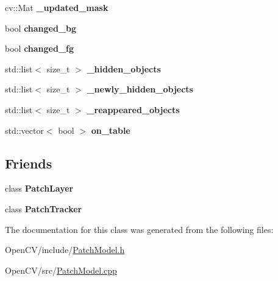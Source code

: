 \begin{DoxyCompactItemize}
cv\+::\+Mat {\bfseries \+\_\+updated\+\_\+mask}
\item 
\hypertarget{classskl_1_1_patch_model_a04e87619d969bf0feb95d6cef58aee38}{}\label{classskl_1_1_patch_model_a04e87619d969bf0feb95d6cef58aee38} 
bool {\bfseries changed\+\_\+bg}
\item 
\hypertarget{classskl_1_1_patch_model_ae2d183017afc081074fc6172b801ddff}{}\label{classskl_1_1_patch_model_ae2d183017afc081074fc6172b801ddff} 
bool {\bfseries changed\+\_\+fg}
\item 
\hypertarget{classskl_1_1_patch_model_a685ba43b43d79c6367ffe9756a57ae0c}{}\label{classskl_1_1_patch_model_a685ba43b43d79c6367ffe9756a57ae0c} 
std\+::list$<$ size\+\_\+t $>$ {\bfseries \+\_\+hidden\+\_\+objects}
\item 
\hypertarget{classskl_1_1_patch_model_a5513394f563a573422b212a4b52a3f8d}{}\label{classskl_1_1_patch_model_a5513394f563a573422b212a4b52a3f8d} 
std\+::list$<$ size\+\_\+t $>$ {\bfseries \+\_\+newly\+\_\+hidden\+\_\+objects}
\item 
\hypertarget{classskl_1_1_patch_model_aec19f93cb798d912d0abeea15822d772}{}\label{classskl_1_1_patch_model_aec19f93cb798d912d0abeea15822d772} 
std\+::list$<$ size\+\_\+t $>$ {\bfseries \+\_\+reappeared\+\_\+objects}
\item 
\hypertarget{classskl_1_1_patch_model_a7f89389707a3ccc624cde071f0b97007}{}\label{classskl_1_1_patch_model_a7f89389707a3ccc624cde071f0b97007} 
std\+::vector$<$ bool $>$ {\bfseries on\+\_\+table}
\end{DoxyCompactItemize}
\subsection*{Friends}
\begin{DoxyCompactItemize}
\item 
\hypertarget{classskl_1_1_patch_model_a21c4d8aa35ab6b7ca00f74ceb9c62451}{}\label{classskl_1_1_patch_model_a21c4d8aa35ab6b7ca00f74ceb9c62451} 
class {\bfseries Patch\+Layer}
\item 
\hypertarget{classskl_1_1_patch_model_a06137dac0e3c805556caa28e75365d9f}{}\label{classskl_1_1_patch_model_a06137dac0e3c805556caa28e75365d9f} 
class {\bfseries Patch\+Tracker}
\end{DoxyCompactItemize}


The documentation for this class was generated from the following files\+:\begin{DoxyCompactItemize}
\item 
Open\+C\+V/include/\hyperlink{_patch_model_8h}{Patch\+Model.\+h}\item 
Open\+C\+V/src/\hyperlink{_patch_model_8cpp}{Patch\+Model.\+cpp}\end{DoxyCompactItemize}
